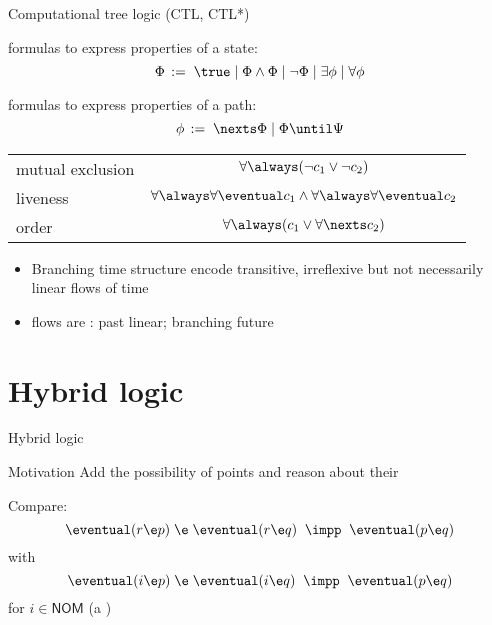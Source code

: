 \documentclass{beamer}
\begin{document}
\begin{slide}{Computational tree logic (CTL, CTL*)}\label{s:45}
\small

  formulas to express  properties of a state:
\[
\Phi\, := \; \true \mid \Phi \wedge \Phi \mid \neg \Phi \mid \exists \phi \mid \forall \phi
\]


 formulas to express properties of a path:
\[
\phi\, := \; \nexts \Phi \mid  \Phi \until \Psi
\]

\vspace{0.2cm}
\begin{center}
\begin{tabular}{|l|c|}
\hline
mutual exclusion  & $\forall \always (\neg c_1 \vee \neg c_2)$ \\
 liveness & $\forall \always \forall \eventual c_1 \wedge \forall \always \forall  \eventual c_2$\\
order  & $\forall \always (c_1 \vee \forall\nexts c_2)$\\
\hline
\end{tabular}  
\end{center}

\begin{itemize}
\item Branching time structure encode transitive, irreflexive but not necessarily linear flows of time
\item flows are : past linear; branching future
\end{itemize}
\end{slide}


\section{Hybrid logic}
\begin{slide}{Hybrid logic}\label{s:46}
\small

\begin{block}{Motivation}
Add the possibility of  points and reason about their 

\vspace{0.5cm}
Compare:
\begin{equation*}
\eventual (r \e p)\; \e\; \eventual (r \e q)\; \; \impp\; \; \eventual (p \e q)
\end{equation*}
with
\begin{equation*}
\eventual (i \e p)\; \e\; \eventual (i \e q)\; \; \impp\; \; \eventual (p \e q)
\end{equation*}
for $i \in \mathsf{NOM}$ (a )
\end{block}
\end{slide}
\end{document}
